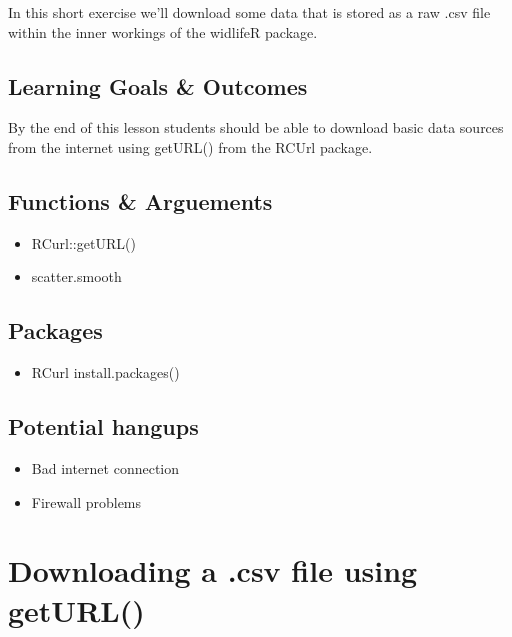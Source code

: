 \documentclass[]{book}
\providecommand{\tightlist}{%
  \setlength{\itemsep}{0pt}\setlength{\parskip}{0pt}}
\theoremstyle{definition}
\theoremstyle{definition}
\theoremstyle{definition}
\theoremstyle{remark}
\begin{document}
In this short exercise we'll download some data that is stored as a raw
.csv file within the inner workings of the widlifeR package.

\subsection{Learning Goals \& Outcomes}\label{learning-goals-outcomes}

By the end of this lesson students should be able to download basic data
sources from the internet using getURL() from the RCUrl package.

\subsection{Functions \& Arguements}\label{functions-arguements-2}

\begin{itemize}
\tightlist
\item
  RCurl::getURL()
\item
  scatter.smooth
\end{itemize}

\subsection{Packages}\label{packages-3}

\begin{itemize}
\tightlist
\item
  RCurl install.packages()
\end{itemize}

\subsection{Potential hangups}\label{potential-hangups-2}

\begin{itemize}
\tightlist
\item
  Bad internet connection
\item
  Firewall problems
\end{itemize}

\section{\texorpdfstring{\protect\hyperlink{section-3}{} Downloading a
.csv file using
getURL()}{ Downloading a .csv file using getURL()}}\label{downloading-a-.csv-file-using-geturl}
\end{document}
